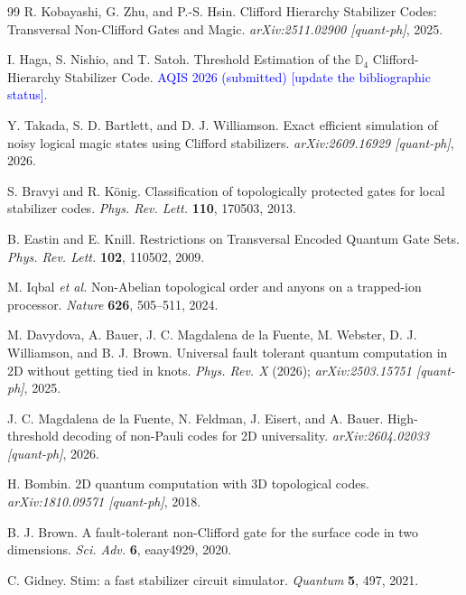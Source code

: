 \documentclass[a4paper]{article}
\newcommand{\blue}[1]{\textcolor{blue}{#1}}
\begin{document}
\begin{thebibliography}{99}
R. Kobayashi, G. Zhu, and P.-S. Hsin.
\newblock Clifford Hierarchy Stabilizer Codes: Transversal Non-Clifford Gates and Magic.
\newblock \textit{arXiv:2511.02900 [quant-ph]}, 2025.

I. Haga, S. Nishio, and T. Satoh.
\newblock Threshold Estimation of the $\mathbb{D}_4$ Clifford-Hierarchy Stabilizer Code.
\newblock \blue{AQIS 2026 (submitted) [update the bibliographic status].}

Y. Takada, S. D. Bartlett, and D. J. Williamson.
\newblock Exact efficient simulation of noisy logical magic states using Clifford stabilizers.
\newblock \textit{arXiv:2609.16929 [quant-ph]}, 2026.

S. Bravyi and R. K\"onig.
\newblock Classification of topologically protected gates for local stabilizer codes.
\newblock \textit{Phys. Rev. Lett.} \textbf{110}, 170503, 2013.

B. Eastin and E. Knill.
\newblock Restrictions on Transversal Encoded Quantum Gate Sets.
\newblock \textit{Phys. Rev. Lett.} \textbf{102}, 110502, 2009.

M. Iqbal \textit{et al.}
\newblock Non-Abelian topological order and anyons on a trapped-ion processor.
\newblock \textit{Nature} \textbf{626}, 505--511, 2024.

M. Davydova, A. Bauer, J. C. Magdalena de la Fuente, M. Webster, D. J. Williamson, and B. J. Brown.
\newblock Universal fault tolerant quantum computation in 2D without getting tied in knots.
\newblock \textit{Phys. Rev. X} (2026); \textit{arXiv:2503.15751 [quant-ph]}, 2025.

J. C. Magdalena de la Fuente, N. Feldman, J. Eisert, and A. Bauer.
\newblock High-threshold decoding of non-Pauli codes for 2D universality.
\newblock \textit{arXiv:2604.02033 [quant-ph]}, 2026.

H. Bombin.
\newblock 2D quantum computation with 3D topological codes.
\newblock \textit{arXiv:1810.09571 [quant-ph]}, 2018.

B. J. Brown.
\newblock A fault-tolerant non-Clifford gate for the surface code in two dimensions.
\newblock \textit{Sci. Adv.} \textbf{6}, eaay4929, 2020.

C. Gidney.
\newblock Stim: a fast stabilizer circuit simulator.
\newblock \textit{Quantum} \textbf{5}, 497, 2021.


\end{thebibliography}
\end{document}
